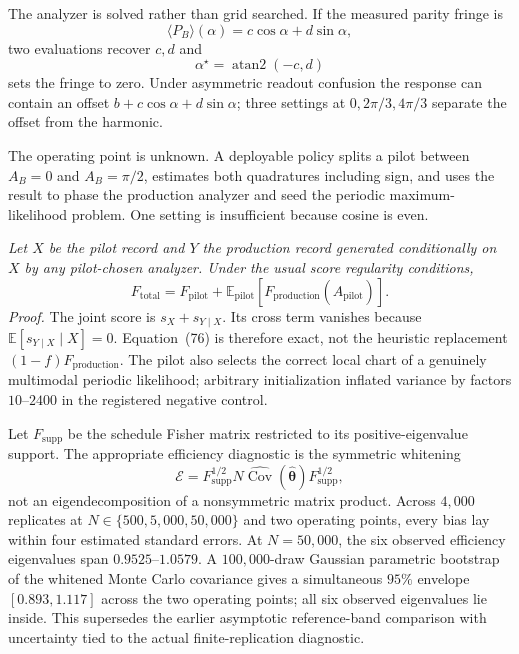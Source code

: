\documentclass[11pt]{article}
\newcommand{\SubSect}[1]{\vspace{0.22em}{\large\bfseries #1}\par\vspace{0.18em}}
\newcommand{\Prop}[1]{\vspace{0.35em}{\bfseries #1}\par\vspace{0.12em}}
\begin{document}
\setcounter{page}{24}
\thispagestyle{plain}
\fontsize{9.5}{11.5}\selectfont
The analyzer is solved rather than grid searched. If the measured parity fringe is
\begin{equation}
  \langle P_B\rangle(\alpha)=c\cos\alpha+d\sin\alpha,
  \tag{74}
\end{equation}
two evaluations recover $c,d$ and
\begin{equation}
  \alpha^\star=\operatorname{atan2}(-c,d)
  \tag{75}
\end{equation}
sets the fringe to zero. Under asymmetric readout confusion the response can contain an offset
$b+c\cos\alpha+d\sin\alpha$; three settings at $0,2\pi/3,4\pi/3$ separate the offset from the harmonic.

\SubSect{6.5\quad Adaptive recentering and periodic identifiability}
The operating point is unknown. A deployable policy splits a pilot between $A_B=0$ and $A_B=\pi/2$, estimates both quadratures including sign, and uses the result to phase the production analyzer and seed the periodic maximum-likelihood problem. One setting is insufficient because cosine is even.

\Prop{Lemma 6.3 (exact adaptive Fisher decomposition).}
\emph{Let $X$ be the pilot record and $Y$ the production record generated conditionally on $X$ by any pilot-chosen analyzer. Under the usual score regularity conditions,}
\begin{equation}
  F_{\mathrm{total}}
  =F_{\mathrm{pilot}}
  +\mathbb E_{\mathrm{pilot}}\!\left[
      F_{\mathrm{production}}(\widehat A_{\mathrm{pilot}})
    \right].
  \tag{76}
\end{equation}
\emph{Proof.} The joint score is $s_X+s_{Y\mid X}$. Its cross term vanishes because
$\mathbb E[s_{Y\mid X}\mid X]=0$. Equation~(76) is therefore exact, not the heuristic replacement
$(1-f)F_{\mathrm{production}}$. The pilot also selects the correct local chart of a genuinely multimodal periodic likelihood; arbitrary initialization inflated variance by factors $10$--$2400$ in the registered negative control.

\SubSect{6.6\quad Estimator efficiency on the identifiable quotient}
Let $F_{\mathrm{supp}}$ be the schedule Fisher matrix restricted to its positive-eigenvalue support. The appropriate efficiency diagnostic is the symmetric whitening
\begin{equation}
  \mathcal E=F_{\mathrm{supp}}^{1/2}
  N\widehat{\operatorname{Cov}}(\widehat{\boldsymbol\theta})
  F_{\mathrm{supp}}^{1/2},
  \tag{77}
\end{equation}
not an eigendecomposition of a nonsymmetric matrix product. Across $4{,}000$ replicates at
$N\in\{500,5{,}000,50{,}000\}$ and two operating points, every bias lay within four estimated standard errors. At $N=50{,}000$, the six observed efficiency eigenvalues span $0.9525$--$1.0579$. A $100{,}000$-draw Gaussian parametric bootstrap of the whitened Monte Carlo covariance gives a simultaneous $95\%$ envelope $[0.893,1.117]$ across the two operating points; all six observed eigenvalues lie inside. This supersedes the earlier asymptotic reference-band comparison with uncertainty tied to the actual finite-replication diagnostic.
\end{document}
